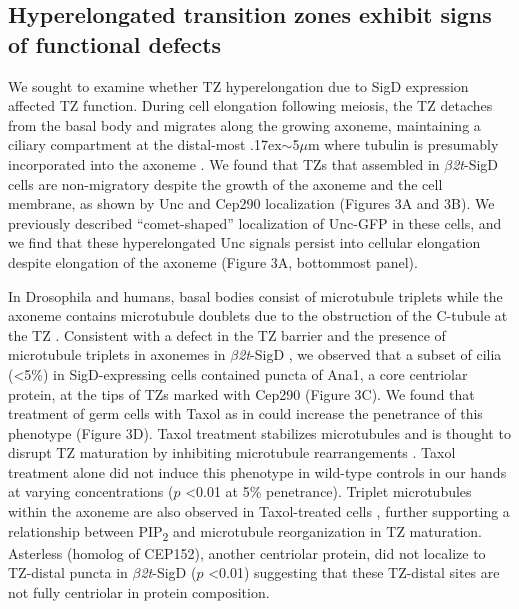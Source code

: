 \documentclass[12pt, twoside, letterpaper]{article}
\newcommand{\PIP}{PIP\textsubscript{2}}
\newcommand{\sigd}{$\beta$\textit{2t}-SigD}
\begin{document}
\begin{doublespacing}
\begin{linenumbers}
    \subsection{Hyperelongated transition zones exhibit signs of functional defects}
    We sought to examine whether TZ hyperelongation due to SigD expression
    affected TZ function.
    During cell elongation following meiosis, the TZ detaches from
    the basal body and migrates along the growing axoneme, maintaining a ciliary compartment
    at the distal-most {\raise.17ex\hbox{$\scriptstyle\sim$}}5$\mu$m where tubulin
    is presumably incorporated into the axoneme
    \citep{basiri2014migrating, fabian2012drosophila}.
    We found that
    TZs that assembled in \sigd{} cells are non-migratory despite the growth of the
    axoneme and the cell membrane, as shown by Unc and Cep290 localization
    (Figures 3A and 3B).
    We previously described ``comet-shaped'' localization of Unc-GFP in these cells,
    and we find that these hyperelongated Unc signals persist into cellular elongation
    despite elongation of the axoneme (Figure 3A, bottommost panel).

    In Drosophila and humans, basal bodies consist of microtubule triplets
    \citep{jana2016drosophila, lattao2017centrioles}
    while the axoneme contains microtubule doublets due to the obstruction of
    the C-tubule at the TZ \citep{gottardo2013cilium}.
    Consistent with a defect in the TZ barrier and the presence of
    microtubule triplets in axonemes in \sigd{} \citep{wei2008depletion},
    we observed that a subset of cilia (<5\%) in SigD-expressing cells
    contained puncta of Ana1, a core centriolar protein, at the tips
    of TZs marked with Cep290 (Figure 3C).
    We found that treatment of germ cells with Taxol as in \citep{riparbelli2013unique}
    could increase the penetrance of this phenotype (Figure 3D).
    Taxol treatment stabilizes microtubules and is thought to disrupt TZ maturation
    by inhibiting microtubule rearrangements \citep{riparbelli2012assembly}.
    Taxol treatment alone did not induce this phenotype in wild-type controls in our hands
    at varying concentrations ($p$ <0.01 at 5\% penetrance).
    Triplet microtubules within the axoneme are also observed in Taxol-treated cells
    \citep{riparbelli2013unique}, further supporting a relationship between
    \PIP{} and microtubule reorganization in TZ maturation.
    Asterless (homolog of CEP152), another centriolar protein,
    did not localize to TZ-distal puncta in \sigd{}
    \citep{dzhindzhev2010asterless, blachon2008drosophila} ($p$ <0.01)
    suggesting that these TZ-distal
    sites are not fully centriolar in protein composition.


\end{linenumbers}
\end{doublespacing}
\end{document}
